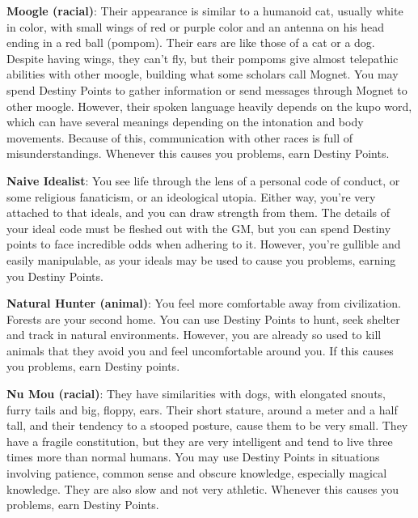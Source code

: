 \begin{multicols}{2}
\textbf{Moogle (racial)}: Their
appearance is similar to a
humanoid cat, usually white in
color, with small wings of red or
purple color and an antenna on
his head ending in a red ball
(pompom). Their ears are like
those of a cat or a dog. Despite
having wings, they can't fly, but
their pompoms give almost telepathic abilities
with other moogle, building what some scholars
call Mognet. You may spend Destiny Points to
gather information or send messages through
Mognet to other moogle. However, their spoken
language heavily depends on the kupo word,
which can have several meanings depending on
the intonation and body movements. Because of
this, communication with other races is full of
misunderstandings. Whenever this causes you
problems, earn Destiny Points.

\textbf{Naive Idealist}: You see life through the
lens of a personal code of conduct, or some
religious fanaticism, or an ideological utopia.
Either way, you're very attached to that ideals, and
you can draw strength from them. The details of
your ideal code must be fleshed out with the GM,
but you can spend Destiny points to face incredible
odds when adhering to it. However, you're gullible
and easily manipulable, as your ideals may be used
to cause you problems, earning you Destiny Points.

\textbf{Natural Hunter (animal)}: You feel more
comfortable away from civilization. Forests are
your second home. You can use Destiny Points to
hunt, seek shelter and track in natural
environments. However, you are already so used to
kill animals that they avoid you and feel
uncomfortable around you. If this causes you
problems, earn Destiny points.

\textbf{Nu Mou (racial)}: They have similarities
with dogs, with elongated snouts, furry tails and
big, floppy, ears. Their
short stature, around a
meter and a half tall, and
their tendency to a
stooped posture, cause
them to be very small.
They have a fragile
constitution, but they are
very intelligent and tend to live three times more
than normal humans. You may use Destiny Points
in situations involving patience, common sense
and obscure knowledge, especially magical
knowledge. They are also slow and not very
athletic. Whenever this causes you problems, earn
Destiny Points.


\end{multicols}
